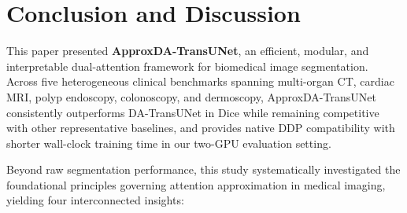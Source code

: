 \section{Conclusion and Discussion}
\label{sec:conclusion}

This paper presented \textbf{ApproxDA-TransUNet}, an efficient, modular, and interpretable dual-attention framework for biomedical image segmentation. Across five heterogeneous clinical benchmarks spanning multi-organ CT, cardiac MRI, polyp endoscopy, colonoscopy, and dermoscopy, ApproxDA-TransUNet consistently outperforms DA-TransUNet in Dice while remaining competitive with other representative baselines, and provides native DDP compatibility with shorter wall-clock training time in our two-GPU evaluation setting.

Beyond raw segmentation performance, this study systematically investigated the foundational principles governing attention approximation in medical imaging, yielding four interconnected insights:
